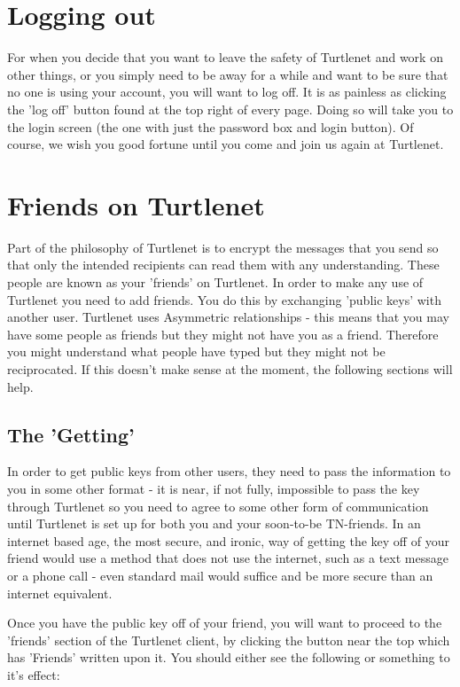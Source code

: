 \section{Logging out}
For when you decide that you want to leave the safety of Turtlenet and work on
other things, or you simply need to be away for a while and want to be sure that
no one is using your account, you will want to log off.  It is as painless as
clicking the 'log off' button found at the top right of every page.  Doing so
will take you to the login screen (the one with just the password box and login
button).  Of course, we wish you good fortune until you come and join us again
at Turtlenet.

\pagebreak
\section{Friends on Turtlenet}
Part of the philosophy of Turtlenet is to encrypt the messages that you send so
that only the intended recipients can read them with any understanding.  These
people are known as your 'friends' on Turtlenet.  In order to make any use of
Turtlenet you need to add friends.  You do this by exchanging 'public keys' with
another user.  Turtlenet uses Asymmetric relationships - this means that you may
have some people as friends but they might not have you as a friend.  Therefore
you might understand what people have typed but they might not be reciprocated.
If this doesn't make sense at the moment, the following sections will help.

\subsection{The 'Getting'}
In order to get public keys from other users, they need to pass the information
to you in some other format - it is near, if not fully, impossible to pass the
key through Turtlenet so you need to agree to some other form of communication
until Turtlenet is set up for both you and your soon-to-be TN-friends.  In an
internet based age, the most secure, and ironic, way of getting the key off of
your friend would use a method that does not use the internet, such as a text
message or a phone call - even standard mail would suffice and be more secure
than an internet equivalent.

Once you have the public key off of your friend, you will want to proceed to the
'friends' section of the Turtlenet client, by clicking the button near the top
which has 'Friends' written upon it.  You should either see the following or
something to it's effect:

